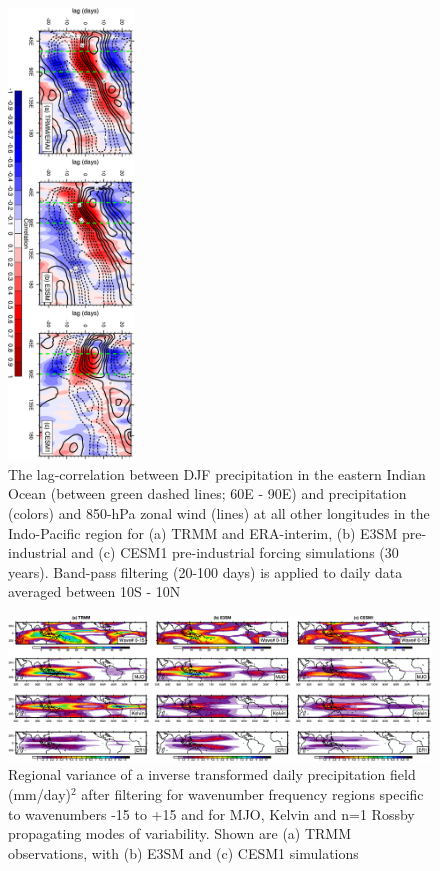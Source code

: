 \documentclass[draft,ms]{AGUTeX}
\begin{document}
\begin{article}
\begin{figure}[t]
  \begin{center}
    \noindent\includegraphics[width=0.3\textwidth,angle=90.]{./figs/f_lagcorr_djf.pdf}
  \end{center}
  \caption{The lag-correlation between DJF precipitation in the eastern Indian Ocean (between green dashed lines; 60\deg E - 90\deg E) and precipitation (colors) and 850-hPa zonal wind (lines) at all other longitudes in the Indo-Pacific region for (a) TRMM and ERA-interim, (b) E3SM pre-industrial and (c) CESM1 pre-industrial forcing simulations (30 years). Band-pass filtering (20-100 days) is applied to daily data averaged between 10\deg S - 10\deg N} 
\label{f_lagcorr_djf}
\end{figure}

\begin{figure}[t]
  \begin{center}
    \noindent\includegraphics[width=1.1\textwidth,angle=0.]{./figs/f_wave_var_DJF_PRECT.pdf}
  \end{center}
  \caption{Regional variance of a inverse transformed daily precipitation field (mm/day)$^2$ after filtering for wavenumber frequency regions specific to wavenumbers -15 to +15 and for MJO, Kelvin and n=1 Rossby propagating modes of variability. Shown are (a) TRMM observations, with (b) E3SM and (c) CESM1 simulations} 
\label{f_wave_var_DJF_PRECT}
\end{figure}


\end{article}
\end{document}
